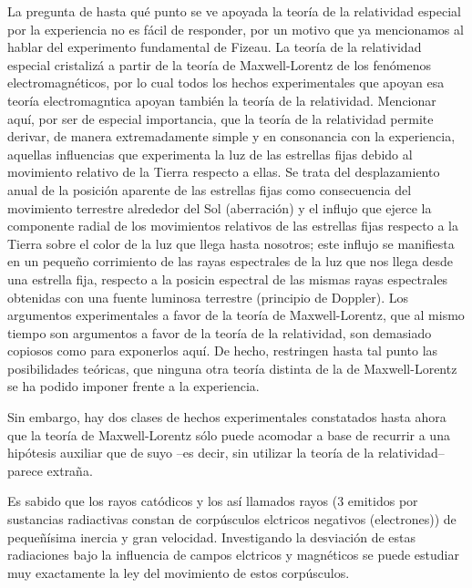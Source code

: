 \documentclass[spanish]{book}
\begin{document}
La pregunta de hasta qué punto se ve apoyada la teoría de la relatividad especial por
la experiencia no es fácil de responder, por un motivo que ya mencionamos al hablar
del experimento fundamental de Fizeau. La teoría de la relatividad especial cristalizá a
partir de la teoría de Maxwell-Lorentz de los fenómenos electromagnéticos, por lo cual
todos los hechos experimentales que apoyan esa teoría electromagntica apoyan
también la teoría de la relatividad. Mencionar aquí, por ser de especial importancia,
que la teoría de la relatividad permite derivar, de manera extremadamente simple y
en consonancia con la experiencia, aquellas influencias que experimenta la luz de las
estrellas fijas debido al movimiento relativo de la Tierra respecto a ellas. Se trata del
desplazamiento anual de la posición aparente de las estrellas fijas como
consecuencia del movimiento terrestre alrededor del Sol (aberración) y el influjo que
ejerce la componente radial de los movimientos relativos de las estrellas fijas respecto
a la Tierra sobre el color de la luz que llega hasta nosotros; este influjo se manifiesta
en un pequeño corrimiento de las rayas espectrales de la luz que nos llega desde una
estrella fija, respecto a la posicin espectral de las mismas rayas espectrales obtenidas
con una fuente luminosa terrestre (principio de Doppler). Los argumentos
experimentales a favor de la teoría de Maxwell-Lorentz, que al mismo tiempo son argumentos
a favor de la teoría de la relatividad, son demasiado copiosos como para
exponerlos aquí. De hecho, restringen hasta tal punto las posibilidades teóricas, que
ninguna otra teoría distinta de la de Maxwell-Lorentz se ha podido imponer frente a la
experiencia.

Sin embargo, hay dos clases de hechos experimentales constatados hasta ahora que la
teoría de Maxwell-Lorentz sólo puede acomodar a base de recurrir a una hipótesis
auxiliar que de suyo --es decir, sin utilizar la teoría de la relatividad-- parece extraña.

Es sabido que los rayos catódicos y los así llamados rayos (3 emitidos por sustancias
radiactivas constan de corpúsculos elctricos negativos (electrones)) de pequeñísima
inercia y gran velocidad. Investigando la desviación de estas radiaciones bajo la
influencia de campos elctricos y magnéticos se puede estudiar muy exactamente la ley
del movimiento de estos corpúsculos.
\end{document}
